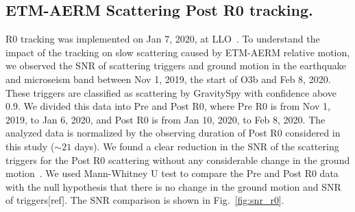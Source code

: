 \documentclass[12pt]{iopart}
\begin{document}
\subsection{ETM-AERM Scattering Post R0 tracking.}
R0 tracking was implemented on Jan 7, 2020, at LLO~\cite{alog_anamaria}. To understand the impact of the tracking on slow scattering caused by ETM-AERM relative motion, we observed the SNR of scattering triggers and ground motion in the earthquake and microseism band between Nov 1, 2019, the start of O3b and Feb 8, 2020. These triggers are classified as scattering by GravitySpy with confidence above 0.9. We divided this data into Pre and Post R0, where Pre R0 is from Nov 1, 2019, to Jan 6, 2020, and Post R0 is from Jan 10, 2020, to Feb 8, 2020. The analyzed data is normalized by the observing duration of Post R0 considered in this study ($\sim 21$ days). We found a clear reduction in the SNR of the scattering triggers for the Post R0 scattering without any considerable change in the ground motion~\cite{alogsid_R0}. We used Mann-Whitney U test to compare the Pre and Post R0 data with the null hypothesis that there is no change in the ground motion and SNR of triggers[ref]. The SNR comparison is shown in Fig.~\ref{fig:snr_r0}.
\par
\end{document}
